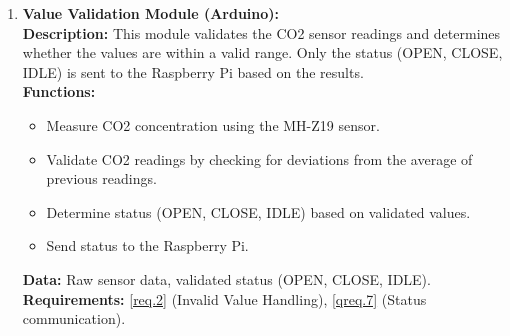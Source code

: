 \begin{enumerate}
    \item \textbf{Value Validation Module (Arduino):} \\ 
        \textbf{Description:} This module validates the CO2 sensor readings and determines whether the values are within a valid range. Only the status (OPEN, CLOSE, IDLE) is sent to the Raspberry Pi based on the results. \\ 
        \textbf{Functions:}
        \begin{itemize}
            \item Measure CO2 concentration using the MH-Z19 sensor.
            \item Validate CO2 readings by checking for deviations from the average of previous readings.
            \item Determine status (OPEN, CLOSE, IDLE) based on validated values.
            \item Send status to the Raspberry Pi.
        \end{itemize}
        \textbf{Data:} Raw sensor data, validated status (OPEN, CLOSE, IDLE). \\ 
        \textbf{Requirements:} \ref{req.2} (Invalid Value Handling), \ref{qreq.7} (Status communication).

\end{enumerate}
\newpage
